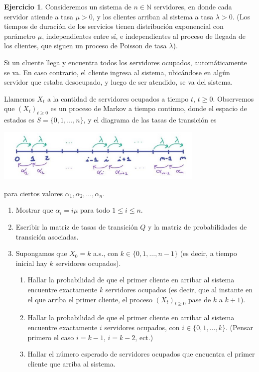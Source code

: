 \documentclass{article}
\newcommand{\naturalnum}{\mathbb{N}}
\theoremstyle{definition}
\newtheorem{exercise}{Ejercicio}
\begin{document}
\begingroup
\newpage
\newcommand{\markovProcess}{(X_t)_{t \geq 0}}
\newcommand{\stateSpace}{S}

\begin{exercise}
Consideremos un sistema de $n \in \naturalnum$ servidores, en donde cada servidor atiende a tasa $\mu > 0$, y los clientes arriban al sistema a tasa $\lambda > 0$.
(Los tiempos de duración de los servicios tienen distribución exponencial con parámetro $\mu$, independientes entre sí, e independientes al proceso de llegada de los clientes, que siguen un proceso de Poisson de tasa $\lambda$).

Si un cluente llega y encuentra todos los servidores ocupados, automáticamente se va.
En caso contrario, el cliente ingresa al sistema, ubicándose en algún servidor que estaba desocupado, y luego de ser atendido, se va del sistema.

Llamemos $X_t$ a la cantidad de servidores ocupados a tiempo $t$, $t \geq 0$.
Observemos que $\markovProcess$ es un proceso de Markov a tiempo continuo, donde el espacio de estados es $\stateSpace = \{0, 1, \dots, n\}$, y el diagrama de las tasas de transición es
\begin{center}
\includegraphics[width=0.75\textwidth]{diagrama_de_las_tasas_de_transicion}
\end{center}
para ciertos valores $\alpha_1, \alpha_2, \dots, \alpha_n$.
\begin{enumerate}[ref=\theexercise.\labelenumi]
	\item Mostrar que \(\alpha_i = i \mu\) para todo \(1 \leq i \leq n\).
	\item Escribir la matriz de tasas de transición \(Q\) y la matriz de probabilidades de transición asociadas.
	\item Supongamos que \(X_0 = k\) a.s., con \(k \in \{0, 1, \dots, n - 1\}\) (es decir, a tiempo inicial hay \(k\) servidores ocupados).
	\begin{enumerate}[label= \roman*., ref=\theexercise.\labelenumi.\labelenumii]
		\item Hallar la probabilidad de que el primer cliente en arribar al sistema encuentre exactamente $k$ servidores ocupados (es decir, que al instante en el que arriba el primer cliente, el proceso $\markovProcess$ pase de $k$ a $k + 1$).
		\item Hallar la probabilidad de que el primer cliente en arribar al sistema encuentre exactamente $i$ servidores ocupados, con $i \in \{0, 1, \dots, k\}$.
		(Pensar primero el caso $i = k - 1$, $i = k - 2$, ect.)
		\item Hallar el número esperado de servidores ocupados que encuentra el primer cliente que arriba al sistema.
	\end{enumerate}
\end{enumerate}
\end{exercise}
\end{document}
